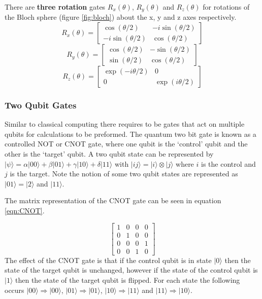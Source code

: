 There are {\bf three rotation} gates $R_x(\theta)$, $R_y(\theta)$ and $R_z(\theta)$ for rotations of the Bloch sphere (figure \ref{fig:bloch}) about the x, y and z axes respectively. 
\begin{equation}
    R_x(\theta) = \begin{bmatrix}
\cos (\theta/2) & -i \sin (\theta/2) \\
-i \sin (\theta/2) & \cos (\theta/2) 
\end{bmatrix}  
\end{equation}
\begin{equation}
    R_y(\theta) = \begin{bmatrix}
\cos (\theta/2) & - \sin (\theta/2) \\
\sin (\theta/2) & \cos (\theta/2) 
\end{bmatrix}  
\end{equation}
\begin{equation}
    R_z(\theta) = \begin{bmatrix}
\exp (-i \theta/2) & 0 \\
0 & \exp (i \theta/2) 
\end{bmatrix}  
\end{equation}


\subsubsection{Two Qubit Gates}\label{sec:twoqubit}
Similar to classical computing there requires to be gates that act on multiple qubits for calculations to be preformed. 
The quantum two bit gate is known as a controlled NOT or CNOT gate, where one qubit is the `control' qubit and the other is the `target' qubit. \cite{nielsen_quantum_2010}
A two qubit state can be represented by $|\psi\rangle = \alpha |00\rangle + \beta|01\rangle + \gamma|10\rangle + \delta |11\rangle$ with $|ij\rangle=|i\rangle \otimes |j\rangle$ where $i$ is the control and $j$ is the target. 
Note the notion of some two qubit states are represented as $|01\rangle = |2\rangle$ and $|11\rangle$.

The matrix representation of the CNOT gate can be seen in equation \ref{eqn:CNOT}.

\begin{equation}\label{eqn:CNOT}
    \begin{bmatrix}
1 & 0 & 0 & 0 \\
0 & 1 & 0 & 0 \\
0 & 0 & 0 & 1 \\
0 & 0 & 1 & 0 
\end{bmatrix}  
\end{equation}
The effect of the CNOT gate is that if the control qubit is in state $|0\rangle$ then the state of the target qubit is unchanged, however if the state of the control qubit is $|1\rangle$ then the state of the target qubit is flipped. 
For each state the following occurs $|00\rangle \Rightarrow |00\rangle$, $ |01\rangle \Rightarrow |01\rangle$, $ |10\rangle \Rightarrow |11\rangle$ and $|11\rangle \Rightarrow |10\rangle$.


